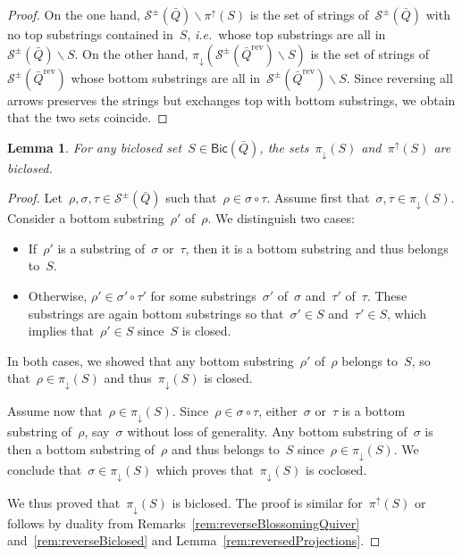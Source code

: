 \documentclass{memo-l}
\newtheorem{lemma}[theorem]{Lemma}
\theoremstyle{definition}
\newcommand{\ssm}{\smallsetminus} %
\newcommand{\ie}{\textit{i.e.}~} %
\newcommand{\strings}{\mathcal{S}} %
\newcommand{\reversed}[1]{#1^{\mathrm{rev}}} %
\newcommand{\Bicl}[1]{\mathsf{Bic}(#1)} %
\newcommand{\projDown}{\pi_\downarrow} %
\newcommand{\projUp}{\pi^\uparrow} %
\begin{document}
\begin{proof}
\enlargethispage{.3cm}
On the one hand, $\strings^\pm(\bar Q) \ssm \projUp(S)$ is the set of strings of~$\strings^\pm(\bar Q)$ with no top substrings contained in~$S$, \ie whose top substrings are all in~$\strings^\pm(\bar Q) \ssm S$.
On the other hand, ${\projDown(\strings^\pm(\reversed{\bar Q}) \ssm S)}$ is the set of strings of~$\strings^\pm(\reversed{\bar Q})$ whose bottom substrings are all in~$\strings^\pm(\reversed{\bar Q}) \ssm S$.
Since reversing all arrows preserves the strings but exchanges top with bottom substrings, we obtain that the two sets coincide. 
\end{proof}

\begin{lemma}
For any biclosed set~$S \in \Bicl{\bar Q}$, the sets~$\projDown(S)$ and~$\projUp(S)$ are biclosed.
\end{lemma}

\begin{proof}
Let~$\rho, \sigma, \tau \in \strings^\pm(\bar Q)$ such that~$\rho \in \sigma \circ \tau$.
Assume first that~$\sigma, \tau \in \projDown(S)$.
Consider a bottom substring~$\rho'$ of~$\rho$.
We distinguish two cases:
\begin{itemize}
\item If~$\rho'$ is a substring of~$\sigma$ or~$\tau$, then it is a bottom substring and thus belongs to~$S$.
\item Otherwise, $\rho' \in \sigma' \circ \tau'$ for some substrings~$\sigma'$ of~$\sigma$ and~$\tau'$ of~$\tau$. These substrings are again bottom substrings so that~$\sigma' \in S$ and~$\tau' \in S$, which implies that~$\rho' \in S$ since~$S$ is closed.
\end{itemize}
In both cases, we showed that any bottom substring~$\rho'$ of~$\rho$ belongs to~$S$, so that~${\rho \in \projDown(S)}$ and thus~$\projDown(S)$ is closed.

Assume now that~$\rho \in \projDown(S)$.
Since~$\rho \in \sigma \circ \tau$, either~$\sigma$ or~$\tau$ is a bottom substring of~$\rho$, say~$\sigma$ without loss of generality.
Any bottom substring of~$\sigma$ is then a bottom substring of~$\rho$ and thus belongs to~$S$ since~$\rho \in \projDown(S)$.
We conclude that~$\sigma \in \projDown(S)$ which proves that~$\projDown(S)$ is coclosed.

We thus proved that~$\projDown(S)$ is biclosed.
The proof is similar for~$\projUp(S)$ or follows by duality from Remarks~\ref{rem:reverseBlossomingQuiver} and~\ref{rem:reverseBiclosed} and Lemma~\ref{rem:reversedProjections}.
\end{proof}
\end{document}
